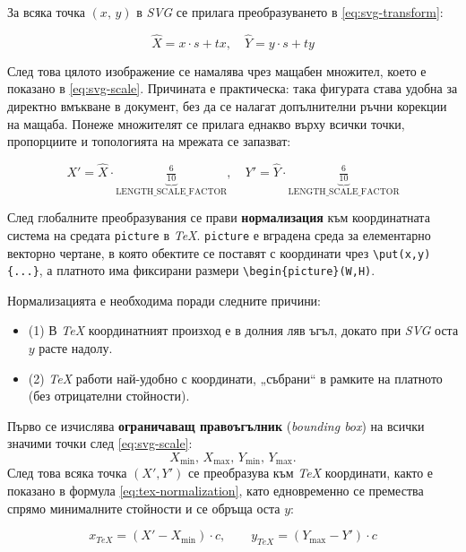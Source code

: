 За всяка точка \((x,\,y)\) в \textit{SVG} се прилага преобразуването в \eqref{eq:svg-transform}:

\begin{equation}
	\widehat{X} = x \cdot s + tx, \quad
	\widehat{Y} = y \cdot s + ty
	\label{eq:svg-transform}
\end{equation}

След това цялото изображение се намалява чрез мащабен множител, което е показано в \eqref{eq:svg-scale}. Причината е практическа: така фигурата става удобна за директно вмъкване в документ, без да се налагат допълнителни ръчни корекции на мащаба. Понеже множителят се прилага еднакво върху всички точки, пропорциите и топологията на мрежата се запазват:

\begin{equation}
	X' = \widehat{X} \cdot \underbrace{\tfrac{6}{10}}_{\text{LENGTH\_SCALE\_FACTOR}},\quad
	Y' = \widehat{Y} \cdot \underbrace{\tfrac{6}{10}}_{\text{LENGTH\_SCALE\_FACTOR}}
	\label{eq:svg-scale}
\end{equation}

След глобалните преобразувания се прави \textbf{нормализация} към координатната система на средата \texttt{picture} в \textit{TeX}. \texttt{picture} е вградена среда за елементарно векторно чертане, в която обектите се поставят с координати чрез \texttt{\textbackslash put(x,y)\{...\}}, а платното има фиксирани размери \texttt{\textbackslash begin\{picture\}(W,H)}.

Нормализацията е необходима поради следните причини:
\begin{itemize}[noitemsep, topsep=0pt]
  \item (1) В \textit{TeX} координатният произход е в долния ляв ъгъл, докато при \textit{SVG} оста \(y\) расте надолу.
  \item (2) \textit{TeX} работи най-удобно с координати, „събрани“ в рамките на платното (без отрицателни стойности).
\end{itemize}

Първо се изчислява \textbf{ограничаващ правоъгълник} (\textit{bounding box}) на всички значими точки след \eqref{eq:svg-scale}:
\[
X_{\min},\,X_{\max},\,Y_{\min},\,Y_{\max}.
\]
След това всяка точка \((X',Y')\) се преобразува към \textit{TeX} координати, както е показано в формула \eqref{eq:tex-normalization}, като едновременно се премества спрямо минималните стойности и се обръща оста \(y\):

\begin{equation}
x_{\textit{TeX}} = (X' - X_{\min})\cdot c,\qquad
y_{\textit{TeX}} = (Y_{\max} - Y')\cdot c
\label{eq:tex-normalization}
\end{equation}

